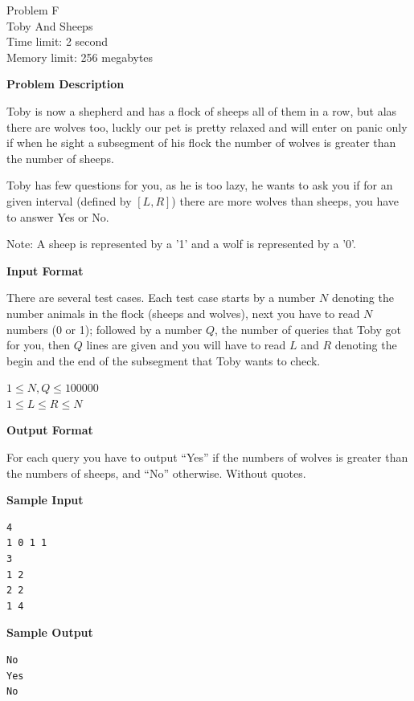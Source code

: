 \documentclass[11pt]{article}
\begin{document}
\newpage
        \begin{center}
            {\LARGE Problem F}\\
            {\Large Toby And Sheeps}\\
            {Time limit: 2 second}\\
            {Memory limit: 256 megabytes}
        \end{center}\textbf{\large Problem Description}

Toby is now a shepherd and has a flock of sheeps all of them in a row, but alas there are wolves too, luckly our pet is pretty relaxed and will enter on panic only if when he sight a subsegment of his flock the number of wolves is greater than the number of sheeps.

Toby has few questions for you, as he is too lazy, he wants to ask you if for an given interval  (defined by $[L, R]$) there are more wolves than sheeps, you have to answer Yes or No.

Note: A sheep is represented by a '1' and a wolf is represented by a '0'.

\textbf{\large Input Format}

There are several test cases.
Each test case starts by a number $N$ denoting the number animals in the flock (sheeps and wolves), next you have to read $N$ numbers (0 or 1); followed by a number $Q$, the number of queries that Toby got for you, then $Q$ lines are given and you will have to read $L$ and $R$ denoting the begin and the end of the subsegment that Toby wants to check.

$1 \le N, Q \le 100000$ \\
$1 \le L \le R \le N$

\textbf{\large Output Format}

For each query you have to output ``Yes'' if the numbers of wolves is greater than the numbers of sheeps, and ``No'' otherwise. Without quotes.

\textbf{\large Sample Input}

\begin{verbatim}
4
1 0 1 1
3
1 2
2 2
1 4
\end{verbatim}

\textbf{\large Sample Output}

\begin{verbatim}
No
Yes
No
\end{verbatim}

\newpage

    
\end{document}
